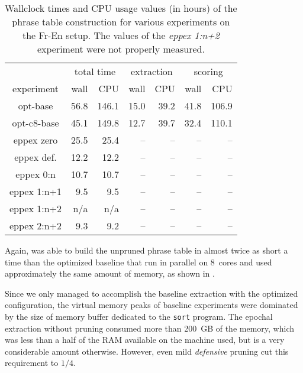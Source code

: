 \begin{table}[ht]
\centering
\begin{tabular}{ | c | r r | r r | r r | }
\hline
 & \multicolumn{2}{|c|}{total time} & \multicolumn{2}{|c|}{extraction} & \multicolumn{2}{|c|}{scoring} \\
experiment & wall & CPU & wall & CPU & wall & CPU \\
\hline
\hline
opt-base      & 56.8 & 146.1 & 15.0 & 39.2 & 41.8 & 106.9 \\
opt-c8-base   & 45.1 & 149.8 & 12.7 & 39.7 & 32.4 & 110.1 \\
eppex zero    & 25.5 &  25.4 & -- & -- & -- & -- \\
\hline
eppex def.    & 12.2 & 12.2 & -- & -- & -- & -- \\
eppex 0:n     & 10.7 & 10.7 & -- & -- & -- & -- \\
eppex 1:n+1   & 9.5 & 9.5 & -- & -- & -- & -- \\
eppex 1:n+2   & n/a & n/a & -- & -- & -- & -- \\
eppex 2:n+2   & 9.3 & 9.2 & -- & -- & -- & -- \\
\hline
\end{tabular}
\caption{\label{fr-en-time-benchmarks}
Wallclock times and CPU usage values (in hours) of the phrase table
construction for various experiments on the Fr-En setup.
The values of the \emph{eppex 1:n+2} experiment were not properly measured.}
\end{table}

Again, \eppex{} was able to build the unpruned phrase table in almost twice
as short a time than the optimized baseline that run in parallel on 8~cores
and used approximately the same amount of memory, as shown in .

Since we only managed to accomplish the baseline extraction with the optimized
configuration, the virtual memory peaks of baseline experiments were dominated by
the size of memory buffer dedicated to the \texttt{sort} program.
The epochal extraction without pruning consumed more than 200~GB of the memory,
which was less than a half of the RAM available on the machine used,
but is a very considerable amount otherwise.
However, even mild \emph{defensive} pruning cut this requirement to $1/4$.

